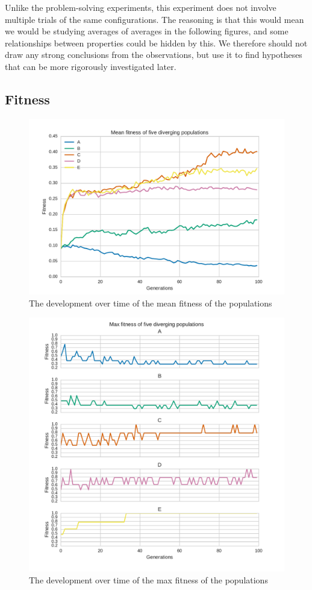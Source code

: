 Unlike the problem-solving experiments, this experiment does not involve multiple trials of the same configurations.
The reasoning is that this would mean we would be studying averages of averages in the following figures,
and some relationships between properties could be hidden by this.
We therefore should not draw any strong conclusions from the observations, but use it to find hypotheses that can be more rigorously investigated later.

\subsection{Fitness}
\begin{figure}
\centering
\includegraphics[width=\columnwidth]{fig/fitnesses}
\caption{The development over time of the mean fitness of the populations}
\label{fig:f_over_t}
\end{figure}

\begin{figure}
\centering
\includegraphics[width=\columnwidth]{fig/fitness_max}
\caption{The development over time of the max fitness of the populations}
\label{fig:max_fitness}
\end{figure}


